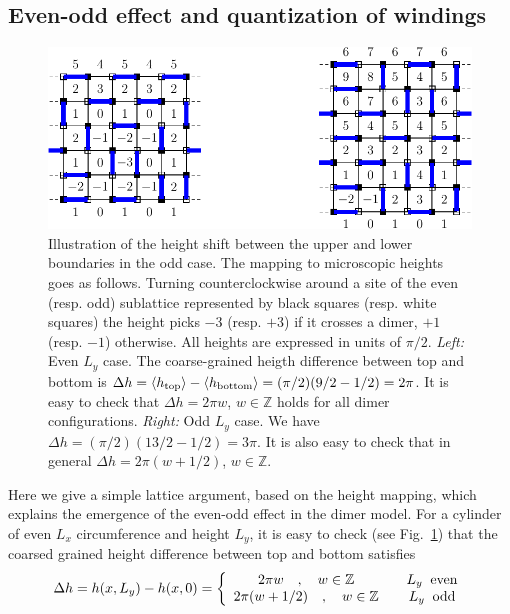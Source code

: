 \documentclass[11pt]{iopart}
\begin{document}
\subsection[\;\;\;\;\;\;\;\;\;\;\;\;\;\;Even-odd effect and quantization of windings]{Even-odd effect and quantization of windings}
\label{sec:evenodd_heights}
\begin{figure}[ht]
 \begin{center}
 \includegraphics{./figures/shift.pdf}
 \end{center}
\caption{Illustration of the height shift between the upper and lower boundaries in the odd case. The mapping to microscopic heights goes as follows. Turning counterclockwise around a site of the even (resp. odd) sublattice represented by black squares (resp. white squares) the height picks $-3$ (resp. $+3$) if it crosses a dimer, $+1$ (resp. $-1$) otherwise. All heights are expressed in units of $\pi/2$. 
 \emph{Left:} Even $L_y$ case. The coarse-grained heigth difference between top and bottom is $\Delta h=\langle h_{\rm top}\rangle-\langle h_{\rm bottom}\rangle=(\pi/2)(9/2-1/2)=2\pi$. It is easy to check that $\Delta h=2\pi w$, $w\in \mathbb{Z}$ holds for all dimer configurations. \emph{Right:} Odd $L_y$ case. We have $\Delta h=(\pi/2)(13/2-1/2)=3\pi$. It is also easy to check that in general $\Delta h=2\pi (w+1/2)$, $w\in \mathbb{Z}$.}
\label{fig:height_shift}
\end{figure}
Here we give a simple lattice argument, based on the height mapping, which explains the emergence of the even-odd effect\cite{Ferdinand} in the dimer model. For a cylinder of even $L_x$ circumference and height $L_y$, it is easy to check (see Fig.~\ref{fig:height_shift}) that the coarsed grained height difference between top and bottom satisfies
\begin{equation}
 \Delta h=h(x,L_y)-h(x,0)=\left\{
 \begin{array}{ccc}
  2\pi w \quad,\quad w\in \mathbb{Z}&&L_y \;\;{\rm even}\\
  2\pi (w+1/2) \quad,\quad w\in \mathbb{Z}&&L_y \;\;{\rm odd}
 \end{array}
 \right.
\end{equation}
\end{document}
